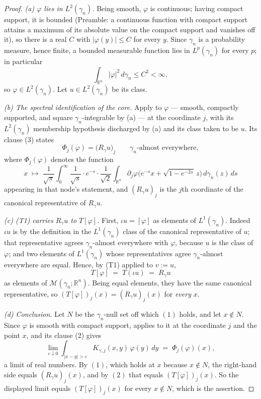 \begin{proof}
\emph{(a) $\varphi$ lies in $L^2(\gamma_n)$.}  Being smooth, $\varphi$ is
continuous; having compact support, it is bounded (Preamble: a continuous
function with compact support attains a maximum of its absolute value on the
compact support and vanishes off it), so there is a real $C$ with
$|\varphi(y)| \leq C$ for every $y$.  Since $\gamma_n$ is a probability
measure, hence finite, a bounded measurable function lies in $L^p(\gamma_n)$
for every $p$; in particular
\[
  \int_{\mathbb{R}^n}|\varphi|^2\,d\gamma_n \leq C^2 < \infty ,
\]
so $\varphi \in L^2(\gamma_n)$.  Let $u \in L^2(\gamma_n)$ be its class.

\emph{(b) The spectral identification of the core.}  Apply
 to $\varphi$ --- smooth, compactly supported,
and square $\gamma_n$-integrable by (a) --- at the coordinate $j$, with its
$L^2(\gamma_n)$ membership hypothesis discharged by (a) and its class taken to
be $u$.  Its clause (3) states
\begin{equation*}
  \Phi_j(\varphi) = \bigl(R_\gamma u\bigr)_j
  \qquad \gamma_n\text{-almost everywhere} , \tag{1}
\end{equation*}
where $\Phi_j(\varphi)$ denotes the function
\[
  x \;\longmapsto\; \frac1{\sqrt\pi}\int_0^\infty
     \frac{1}{\sqrt s}\cdot e^{-s}\cdot\frac1{\sqrt2}
     \int_{\mathbb{R}^n}
       \partial_j\varphi\bigl(e^{-s}x + \sqrt{1-e^{-2s}}\,z\bigr)
     \,d\gamma_n(z)\,ds
\]
appearing in that node's statement, and $(R_\gamma u)_j$ is the $j$th
coordinate of the canonical representative of $R_\gamma u$.

\emph{(c) (T1) carries $R_\gamma u$ to $T[\varphi]$.}  First,
$\iota u = [\varphi]$ as elements of $L^1(\gamma_n)$.  Indeed $\iota u$ is by
the definition in  the $L^1(\gamma_n)$ class of the canonical
representative of $u$; that representative agrees $\gamma_n$-almost everywhere
with $\varphi$, because $u$ is the class of $\varphi$; and two elements of
$L^1(\gamma_n)$ whose representatives agree $\gamma_n$-almost everywhere are
equal.  Hence, by (T1) applied to $v := u$,
\begin{equation*}
  T[\varphi] \;=\; T(\iota u) \;=\; R_\gamma u \tag{2}
\end{equation*}
as elements of $\mathcal{M}(\gamma_n;\mathbb{R}^n)$.  Being equal elements,
they have the same canonical representative, so
$(T[\varphi])_j(x) = (R_\gamma u)_j(x)$ for \emph{every} $x$.

\emph{(d) Conclusion.}  Let $N$ be the $\gamma_n$-null set off which $(1)$
holds, and let $x \notin N$.  Since $\varphi$ is smooth with compact support,
 applies to it at the coordinate $j$ and the point $x$,
and its clause (2) gives
\[
  \lim_{\varepsilon\downarrow0}
    \int_{|x-y|>\varepsilon}K_{\gamma,j}(x,y)\,\varphi(y)\,dy
  \;=\; \Phi_j(\varphi)(x) ,
\]
a limit of real numbers.  By $(1)$, which holds at $x$ because $x \notin N$,
the right-hand side equals $(R_\gamma u)_j(x)$, and by $(2)$ that equals
$(T[\varphi])_j(x)$.  So the displayed limit equals $(T[\varphi])_j(x)$ for
every $x \notin N$, which is the assertion.
\end{proof}
